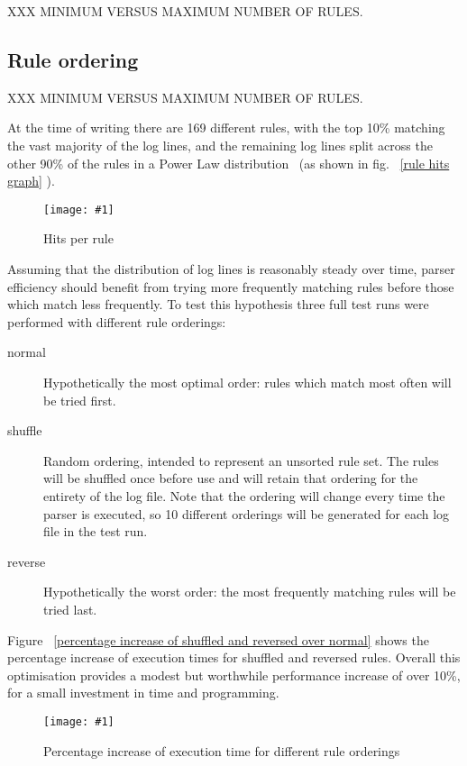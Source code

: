 \documentclass[draft]{svmult}
\newcommand{\showgraph}[3]{%
    \begin{figure}[hbt!]
        \caption{#2}\label{#3}
        \texttt{[image: \#1]}
    \end{figure}
}
\newcommand{\refwithpage}[1]{%
    \empty{}\vref{#1}%
}
\newcommand{\numberOFrules}[0]{%
    169%
}
\begin{document}
XXX MINIMUM VERSUS MAXIMUM NUMBER OF RULES\@.

\subsection{Rule ordering}

\label{Rule ordering}
\label{rule ordering for efficiency}
\label{rule efficiency}

XXX MINIMUM VERSUS MAXIMUM NUMBER OF RULES\@.

At the time of writing there are \numberOFrules{} different rules, with the
top 10\% matching the vast majority of the log lines, and the remaining log
lines split across the other 90\% of the rules in a Power Law
distribution~\cite{powerlaw} (as shown in fig.~\refwithpage{rule hits
graph}).  \showgraph{build/plot-hits}{Hits per rule}{rule hits graph}
Assuming that the distribution of log lines is reasonably steady over time,
parser efficiency should benefit from trying more frequently matching rules
before those which match less frequently.  To test this hypothesis three
full test runs were performed with different rule orderings:

\begin{description}

    \item [normal]  Hypothetically the most optimal order: rules which
        match most often will be tried first.

    \item [shuffle] Random ordering, intended to represent an unsorted rule
        set.  The rules will be shuffled once before use and will retain
        that ordering for the entirety of the log file.  Note that the
        ordering will change every time the parser is executed, so 10
        different orderings will be generated for each log file in the test
        run.

    \item [reverse] Hypothetically the worst order: the most frequently
        matching rules will be tried last.

\end{description}

Figure~\refwithpage{percentage increase of shuffled and reversed over
normal} shows the percentage increase of execution times for shuffled and
reversed rules.  Overall this optimisation provides a modest but worthwhile
performance increase of over 10\%, for a small investment in time and
programming.
\showgraph{build/plot-normal-shuffle-reverse-factor}{Percentage increase of
execution time for different rule orderings}{percentage increase of
shuffled and reversed over normal}
\end{document}
